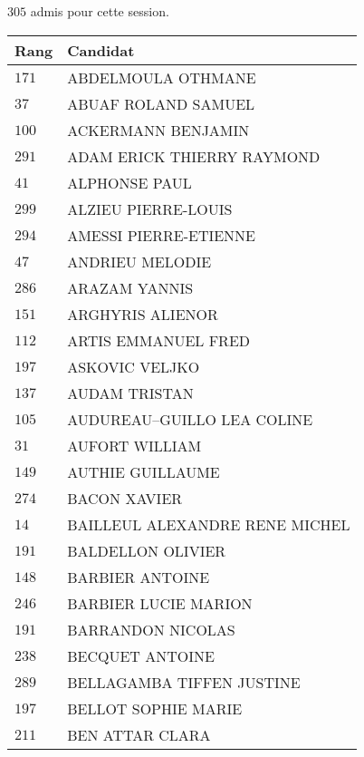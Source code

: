 




  $305$ admis pour cette session.

  \begin{xltabular}{\linewidth}{|l|X|}
    \hline
    \textbf{Rang} & \textbf{Candidat} \\
    \hline
    $171$ & ABDELMOULA OTHMANE \\
    \hline
    $37$ & ABUAF ROLAND SAMUEL \\
    \hline
    $100$ & ACKERMANN BENJAMIN \\
    \hline
    $291$ & ADAM ERICK THIERRY RAYMOND \\
    \hline
    $41$ & ALPHONSE PAUL \\
    \hline
    $299$ & ALZIEU PIERRE-LOUIS \\
    \hline
    $294$ & AMESSI PIERRE-ETIENNE \\
    \hline
    $47$ & ANDRIEU MELODIE \\
    \hline
    $286$ & ARAZAM YANNIS \\
    \hline
    $151$ & ARGHYRIS ALIENOR \\
    \hline
    $112$ & ARTIS EMMANUEL FRED \\
    \hline
    $197$ & ASKOVIC VELJKO \\
    \hline
    $137$ & AUDAM TRISTAN \\
    \hline
    $105$ & AUDUREAU--GUILLO LEA COLINE \\
    \hline
    $31$ & AUFORT WILLIAM \\
    \hline
    $149$ & AUTHIE GUILLAUME \\
    \hline
    $274$ & BACON XAVIER \\
    \hline
    $14$ & BAILLEUL ALEXANDRE RENE MICHEL \\
    \hline
    $191$ & BALDELLON OLIVIER \\
    \hline
    $148$ & BARBIER ANTOINE \\
    \hline
    $246$ & BARBIER LUCIE MARION \\
    \hline
    $191$ & BARRANDON NICOLAS \\
    \hline
    $238$ & BECQUET ANTOINE \\
    \hline
    $289$ & BELLAGAMBA TIFFEN JUSTINE \\
    \hline
    $197$ & BELLOT SOPHIE MARIE \\
    \hline
    $211$ & BEN ATTAR CLARA \\

\end{xltabular}
